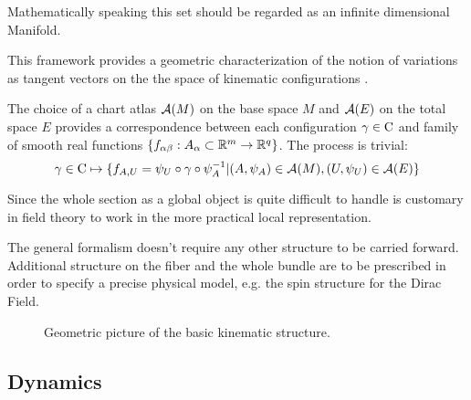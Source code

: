\documentclass[Main]{subfiles}
\begin{document}
	\begin{observation}
	Mathematically speaking this set should be regarded as an infinite dimensional Manifold. 
	
	This framework provides a geometric characterization of the notion of variations as tangent vectors on the the space of kinematic configurations .\cite{Forger2005}
	\end{observation}
	
	\begin{observation}
	The choice of a chart atlas $\mathcal{A}(M)$ on the base space $M$ and $\mathcal{A}(E)$ on the total space $E$ provides a correspondence between each configuration $\gamma \in \mathrm{C}$ and family of smooth real functions $\{f_{\alpha \beta}:A_\alpha \subset \mathbb{R}^m \rightarrow \mathbb{R}^q \}$.
	The process is trivial:
	\begin{displaymath}
		\gamma \in \mathrm{C} \mapsto \{f_{A,U}=\psi_U \circ \gamma \circ \psi_A^{-1} \vert (A,\psi_A) \in \mathcal{A}(M), (U,\psi_U)\in \mathcal{A}(E)   \}
	\end{displaymath}
	

	Since the whole section as a global object is quite difficult to handle is customary in field theory to work in the more practical local representation. 
	\end{observation}	
	
	\begin{observation}
	 	The general formalism doesn't require any other structure to be carried forward.
	 	Additional structure on the fiber and the whole bundle are to be prescribed in order to specify a precise physical model, e.g. the spin structure for the Dirac Field.\cite{Benini}
	 \end{observation}	
	
	\begin{figure}[h!]
 	 	\caption{Geometric picture of the basic kinematic structure.}
  		\centering
	\end{figure}	
	
	\subsection{Dynamics}
	
\end{document}
